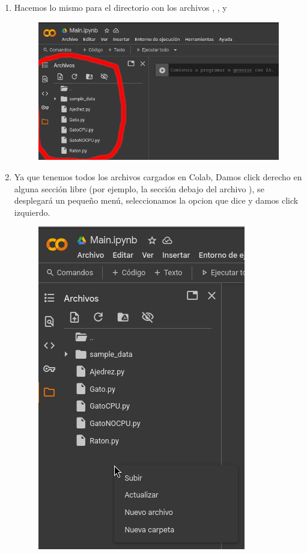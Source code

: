 \documentclass[12pt, Tahoma]{article}
\begin{document}
\begin{enumerate}
\begin{figure}[H]
			\end{figure}
		\item Hacemos lo mismo para el directorio  con los archivos , ,  y 
			\begin{figure}[H]
				\centering
				\includegraphics[scale=2]{correr14.png}
			\end{figure}
		\item Ya que tenemos todos los archivos cargados en Colab, Damos click derecho en alguna sección libre (por ejemplo, la sección debajo del archivo ), se desplegará un pequeño menú, seleccionamos la opcion que dice  y damos click izquierdo.
			\begin{figure}[H]
				\centering
				\includegraphics[scale=0.6]{correr15.png}

\end{figure}
\end{enumerate}
\end{document}
